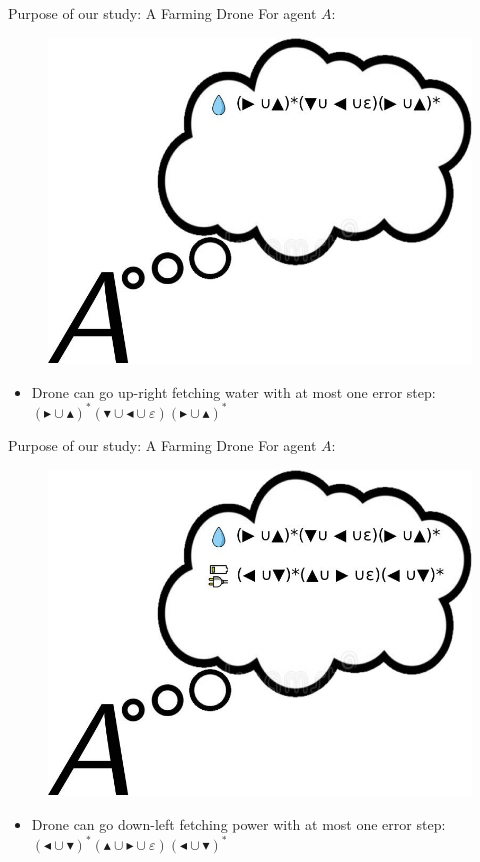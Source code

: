 \documentclass{beamer}
\newcommand{\union}{\cup}
\newcommand{\ep}{\ensuremath{\varepsilon}}
\newcommand{\obsright}{\blacktriangleright}
\newcommand{\obsleft}{\blacktriangleleft}
\newcommand{\obsup}{\blacktriangle}
\newcommand{\obsdown}{\blacktriangledown}
\newcommand{\expwater}{(\obsright \union \obsup)^* (\obsdown \union \obsleft \union \ep) (\obsright \union \obsup)^*}
\newcommand{\exppower}{(\obsleft \union \obsdown)^* (\obsup \union \obsright \union \ep) (\obsleft \union \obsdown)^*}
\begin{document}
\begin{frame}{Purpose of our study: A Farming Drone}
    For agent $A$:
    \begin{figure}
        \centering
        \includegraphics[scale=0.2]{images/A-expectwater.jpg}
    \end{figure}
    \begin{itemize}
        \item Drone can go up-right fetching water with at most one error step: $\expwater$
    \end{itemize}
\end{frame}

\begin{frame}{Purpose of our study: A Farming Drone}
    For agent $A$:
    \begin{figure}
        \centering
        \includegraphics[scale=0.2]{images/A-expectwaterpower.jpg}
    \end{figure}
    \begin{itemize}
        \item Drone can go down-left fetching power with at most one error step: $\exppower$
    \end{itemize}
\end{frame}
\end{document}
